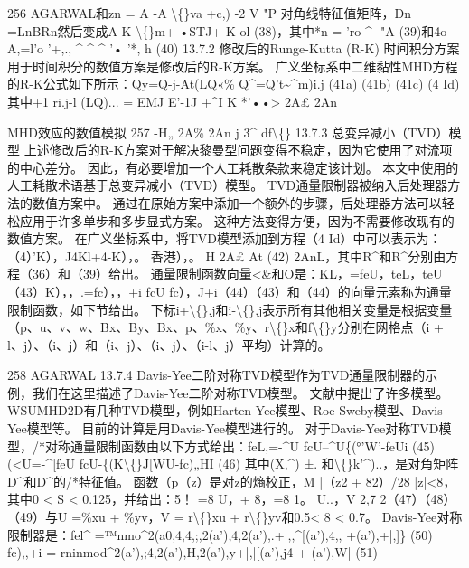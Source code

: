\documentclass[UTF8,11pt,a4paper,openany,fontset=fandol]{ctexbook}
\begin{document}
256 AGARWAL和zn = A -A \textbackslash\{\}va +c,) -2 V "P 对角线特征值矩阵，Dn =LnBRn然后变成A K \textbackslash\{\}m+ •STJ+ K ol (38)，其中*n = 'ro \textasciicircum{} -"A (39)和4o A,=l'o '+,., \textasciicircum{} \textasciicircum{} \textasciicircum{} '• '*, h (40) 13.7.2 修改后的Runge-Kutta (R-K) 时间积分方案用于时间积分的数值方案是修改后的R-K方案。 广义坐标系中二维黏性MHD方程的R-K公式如下所示：Qy=Q-j-At(LQ«\% Q\textasciicircum{}=Q't\textasciitilde{}\textasciicircum{}m)i.j (41a) (41b) (41c) (4 Id) 其中+1 ri.j-l (LQ)... = EMJ E'-1J +\textasciicircum{}I K *'••> 2A£ 2An

MHD效应的数值模拟 257 -H„ 2A\% 2An j 3\textasciicircum{} df\textbackslash\{\} 13.7.3 总变异减小（TVD）模型 上述修改后的R-K方案对于解决黎曼型问题变得不稳定，因为它使用了对流项的中心差分。 因此，有必要增加一个人工耗散条款来稳定该计划。 本文中使用的人工耗散术语基于总变异减小（TVD）模型。 TVD通量限制器被纳入后处理器方法的数值方案中。 通过在原始方案中添加一个额外的步骤，后处理器方法可以轻松应用于许多单步和多步显式方案。 这种方法变得方便，因为不需要修改现有的数值方案。 在广义坐标系中，将TVD模型添加到方程（4 Id）中可以表示为：（4）'K），J4Kl+4-K），。 香港），。 H 2A£ At (42) 2AnL，其中R\textasciicircum{}和R\textasciicircum{}分别由方程（36）和（39）给出。 通量限制函数向量<\&和O是：KL，=feU，teL，teU（43）K），，.=fc），，+i fcU fc），J+i（44）（43）和（44）的向量元素称为通量限制函数，如下节给出。 下标i+\textbackslash\{\},j和i-\textbackslash\{\},j表示所有其他相关变量是根据变量（p、u、v、w、Bx、By、Bx、p、\%x、\%y、r\textbackslash\{\}x和f\textbackslash\{\}y分别在网格点（i + l、j）、（i、j）和（i、j）、（i、j）、（i-l、j）平均）计算的。

258 AGARWAL 13.7.4 Davis-Yee二阶对称TVD模型作为TVD通量限制器的示例，我们在这里描述了Davis-Yee二阶对称TVD模型。 文献中提出了许多模型。 WSUMHD2D有几种TVD模型，例如Harten-Yee模型、Roe-Sweby模型、Davis-Yee模型等。 目前的计算是用Davis-Yee模型进行的。 对于Davis-Yee对称TVD模型，/*对称通量限制函数由以下方式给出：feL,=-\textasciicircum{}U fcU--\textasciicircum{}U\{(°'W'-feUi (45) (<U=-\textasciicircum{}[feU fcU-\{(K\textbackslash\{\}J[WU-fc)„HI (46) 其中(X,\textasciicircum{}) ±. 和\textbackslash\{\}k'\textasciicircum{})..，是对角矩阵D\textasciicircum{}和D\textasciicircum{}的/*特征值。 函数（p（z）是对z的熵校正，M |（z2 + 82）/28 |z|<8，其中0 < S < 0.125，并给出：5！ =8 U，+ 8，=8 1。 U..，V 2,7 2（47）（48）（49）与U =\%xu + \%yv，V = r\textbackslash\{\}xu + r\textbackslash\{\}yv和0.5< 8 < 0.7。 Davis-Yee对称限制器是：fel\textasciicircum{} =™nmo\textasciicircum{}2(a0,4,4,;,2(a'),4,2(a'),.+|,,\textasciicircum{}[(a'),4,, +(a'),+|,]\} (50) fc),,+i = rninmod\textasciicircum{}2(a'),;4,2(a'),H,2(a'),y+|,|[(a'),j4 + (a'),W| (51)
\end{document}
